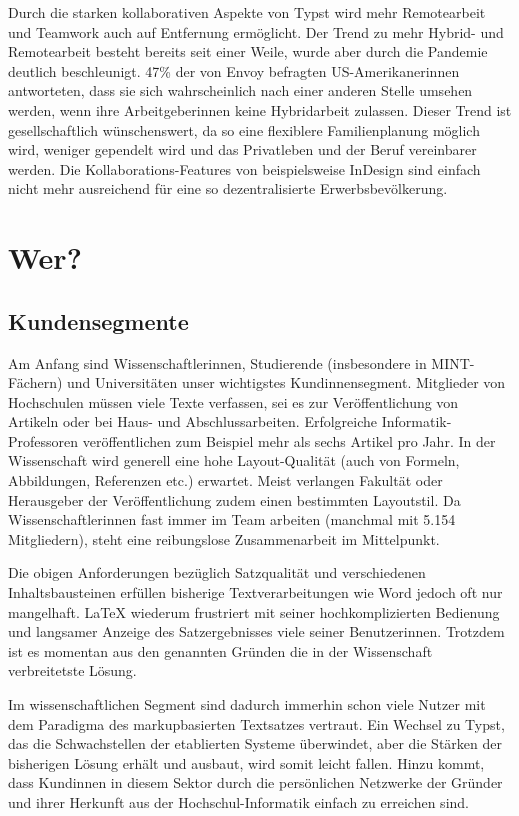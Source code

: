 \documentclass[11pt, a4paper]{article}
\newcommand{\gender}{\raisebox{-.25em}{*}}
\let\oldsection\section
\renewcommand\section{\clearpage\oldsection}
\newcommand{\cited}[1]{\marginsymbol{\textbf{↗} #1}}
\newcommand{\marginsymbol}[1] {\protect\marginsymbolhelper{#1}}
\newcommand{\marginsymbolhelper}[1] {\tabto*{-1cm}\makebox[0cm]{#1}\tabto*{\TabPrevPos}}
\begin{document}
Durch die starken kollaborativen Aspekte von Typst wird mehr Remotearbeit und Teamwork auch auf Entfernung ermöglicht. Der Trend zu mehr \cited{2} Hybrid- und Remotearbeit besteht bereits seit einer Weile, wurde aber durch die Pandemie deutlich beschleunigt. \cited{3} 47\% der von Envoy befragten US-Amerikaner\gender{}innen antworteten, dass sie sich wahrscheinlich nach einer anderen Stelle umsehen werden, wenn ihr\gender{}e Arbeitgeber\gender{}innen keine Hybridarbeit zulassen. Dieser Trend ist gesellschaftlich wünschenswert, da so eine flexiblere Familienplanung möglich wird, weniger gependelt wird und das Privatleben und der Beruf vereinbarer werden. Die Kollaborations-Features von beispielsweise InDesign sind einfach nicht mehr ausreichend für eine so dezentralisierte Erwerbsbevölkerung.

\section*{Wer?}
\subsection*{Kundensegmente}

Am Anfang sind Wissenschaftler\gender{}innen, Studierende (insbesondere in MINT-Fächern) und Universitäten unser wichtigstes Kund\gender{}innensegment. Mitglieder von Hochschulen müssen viele Texte verfassen, sei es zur Veröffentlichung von Artikeln oder bei Haus- und Abschlussarbeiten. \cited{4} Erfolgreiche Informatik-Professoren veröffentlichen zum Beispiel mehr als sechs Artikel pro Jahr. In der Wissenschaft wird generell eine hohe Layout-Qualität (auch von Formeln, Abbildungen, Referenzen etc.) erwartet. Meist verlangen Fakultät oder Herausgeber der Veröffentlichung zudem einen bestimmten Layoutstil. Da Wissenschaftler\gender{}innen fast immer im Team arbeiten (manchmal mit 5.154 Mitgliedern\cited{5}), steht eine reibungslose Zusammenarbeit im Mittelpunkt.

Die obigen Anforderungen bezüglich Satzqualität und verschiedenen Inhaltsbausteinen erfüllen bisherige Textverarbeitungen wie Word jedoch oft nur mangelhaft. LaTeX wiederum \cited{6}frustriert mit seiner hochkomplizierten Bedienung und langsamer Anzeige des Satzergebnisses viele seiner Benutzer\gender{}innen. Trotzdem ist es momentan aus den genannten Gründen die in der Wissenschaft verbreitetste Lösung.

Im wissenschaftlichen Segment sind dadurch immerhin schon viele Nutzer mit dem Paradigma des markupbasierten Textsatzes vertraut. Ein Wechsel zu Typst, das die Schwachstellen der etablierten Systeme überwindet, aber die Stärken der bisherigen Lösung erhält und ausbaut, wird somit leicht fallen. Hinzu kommt, dass Kund\gender{}innen in diesem Sektor durch die persönlichen Netzwerke der Gründer und ihrer Herkunft aus der Hochschul-Informatik einfach zu erreichen sind.
\end{document}
